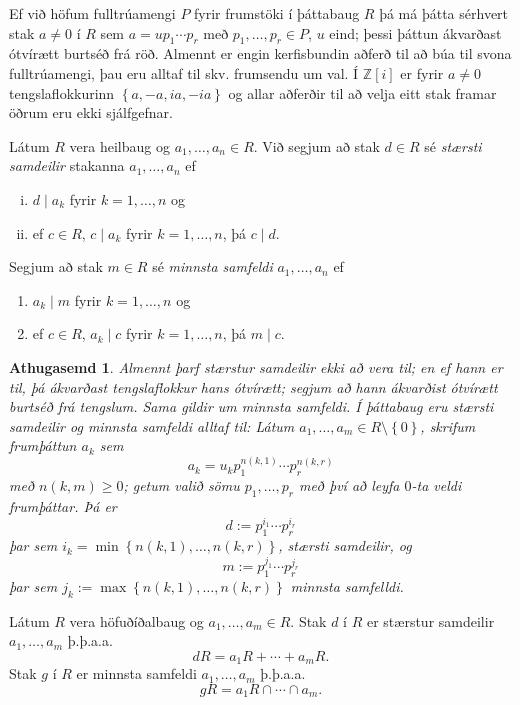 \documentclass[a4paper,icelandic,11pt]{book}
\theoremstyle{plain}
\newtheorem*{ath}{Athugasemd}
\newcommand{\Z}{\mathbb{Z}}
\begin{document}
Ef við höfum fulltrúamengi $P$ fyrir frumstöki í þáttabaug $R$ þá má þátta
sérhvert stak $a\neq 0$ í $R$ sem $a=up_1\cdots p_r$ með $p_1,\dots,p_r\in P$,
$u$ eind; þessi þáttun ákvarðast ótvírætt burtséð frá röð. Almennt er engin
kerfisbundin aðferð til að búa til svona fulltrúamengi, þau
eru alltaf til skv. frumsendu um val. Í $\Z[i]$ er fyrir $a\neq 0$
tengslaflokkurinn $\left\{ a,-a,ia,-ia \right\}$ og allar aðferðir til að velja
eitt stak framar öðrum eru ekki sjálfgefnar.
\begin{skilgr}
  Látum $R$ vera heilbaug og $a_1,\dots,a_n\in R$. Við segjum að stak $d\in R$
  sé \emph{stærsti samdeilir} stakanna $a_1,\dots,a_n$
  ef
  \begin{enumerate}[(i)]
    \item $d\mid a_k$ fyrir $k=1,\dots,n$ og
    \item ef $c\in R$, $c\mid a_k$ fyrir $k=1,\dots,n$, þá $c\mid d$. 
  \end{enumerate}
  Segjum að stak $m\in R$ sé \emph{minnsta samfeldi}
  $a_1,\dots,a_n$ ef
  \begin{enumerate}[(i')]
    \item $a_k\mid m$ fyrir $k=1,\dots,n$ og
    \item ef $c\in R$, $a_k\mid c$ fyrir $k=1,\dots,n$, þá $m\mid c$. 
  \end{enumerate}
\end{skilgr}
\begin{ath}
  Almennt þarf stærstur samdeilir ekki að vera til; en ef hann er til, þá
  ákvarðast tengslaflokkur hans ótvírætt; segjum að hann ákvarðist ótvírætt
  burtséð frá tengslum. Sama gildir um minnsta samfeldi. Í þáttabaug eru stærsti
  samdeilir og minnsta samfeldi alltaf til: Látum $a_1,\dots,a_m\in
  R\setminus\left\{ 0 \right\}$, skrifum frumþáttun $a_k$ sem 
  \[
  a_k = u_k p_1^{n(k,1)}\cdots p_r^{n(k,r)}
  \]
  með $n(k,m)\geq 0$; getum valið sömu $p_1,\dots,p_r$ með því að leyfa $0$-ta
  veldi frumþáttar. Þá er 
  \[
  d := p_1^{i_1}\cdots p_r^{i_r}
  \]
  þar sem $i_k = \min\left\{ n(k,1),\dots,n(k,r) \right\}$, stærsti samdeilir,
  og 
  \[
  m := p_1^{j_1}\cdots p_r^{j_r}
  \]
  þar sem $j_k := \max\left\{ n(k,1),\dots,n(k,r) \right\}$ minnsta samfelldi.
\end{ath}
\begin{setn}
  Látum $R$ vera höfuðíðalbaug og $a_1,\dots,a_m\in R$. Stak $d$ í $R$ er
  stærstur samdeilir $a_1,\dots,a_m$ þ.þ.a.a. \[
  dR = a_1R + \cdots + a_m R.
  \]
  Stak $g$ í $R$ er minnsta samfeldi $a_1,\dots,a_m$ þ.þ.a.a. \[
  gR = a_1 R\cap \cdots \cap a_m.
  \]
\end{setn}
\end{document}
